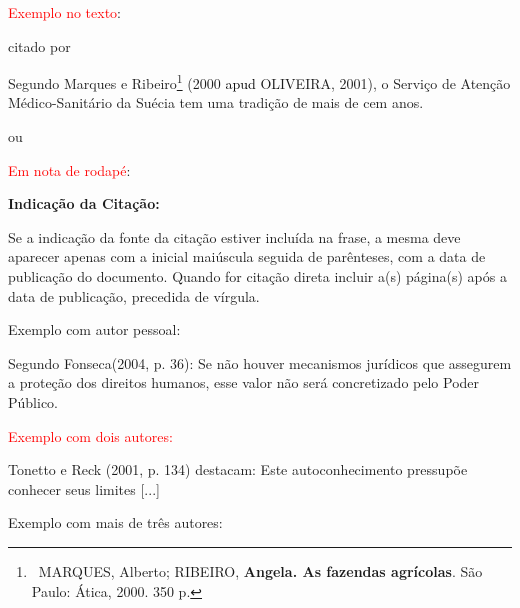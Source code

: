 \bigskip

{\sffamily
	\textrm{\textcolor{red}{Exemplo no texto}}\textrm{:}}

\bigskip

{\sffamily
	\textrm{citado por }}

\bigskip

{\sffamily
	\textrm{Segundo Marques e Ribeiro}\footnote{\ MARQUES, Alberto; RIBEIRO, \textbf{Angela. As fazendas agrícolas}. São
		Paulo: Ática, 2000. 350 p.}\textrm{ (2000 }\textrm{\textcolor{black}{apud }}\textrm{OLIVEIRA, 2001),  o Serviço de
		Atenção Médico-Sanitário da Suécia tem uma tradição de mais de cem anos. }}

\bigskip

{\color{red}
	ou}

{\sffamily
	\textrm{\textcolor{red}{Em nota de rodapé}}\textrm{:}}

\bigskip

{\centering\bfseries\color{red}
	Indicação da Citação:
	\par}

\bigskip

{\sffamily
	\textrm{Se a indicação da fonte da citação estiver incluída na frase, a mesma deve aparecer apenas com a inicial
		maiúscula seguida de parênteses, com a data de publicação do }\textrm{documento. Quando for citação direta incluir a(s)
		página(s) após a data de publicação, precedida de vírgula.}}

\bigskip

{\color{red}
	Exemplo com autor pessoal:}

\bigskip

Segundo Fonseca(2004, p. 36): {\textquotedbl}Se não houver mecanismos jurídicos que assegurem a proteção dos direitos
humanos, esse valor não será concretizado pelo Poder Público.{\textquotedbl}\\

\bigskip

{\sffamily
	\textrm{\textcolor{red}{Exemplo com dois autores: }}}

\bigskip

Tonetto e Reck (2001, p. 134) destacam: {\textquotedbl}Este autoconhecimento pressupõe conhecer seus limites
	[...]{\textquotedbl} \\

\bigskip

{\color{red}
	Exemplo com mais de três autores:}

\bigskip


